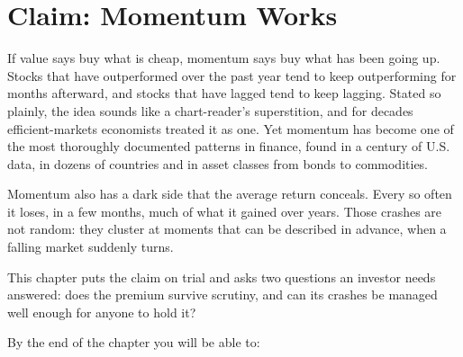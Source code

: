 \makeatletter
{}
\makeatother

\chapter{Claim: Momentum Works}
\label{ch:09}

If value says buy what is cheap, momentum says buy what has been going up. Stocks that have outperformed over the past year tend to keep outperforming for months afterward, and stocks that have lagged tend to keep lagging. Stated so plainly, the idea sounds like a chart-reader's superstition, and for decades efficient-markets economists treated it as one. Yet momentum has become one of the most thoroughly documented patterns in finance, found in a century of U.S. data, in dozens of countries and in asset classes from bonds to commodities.

Momentum also has a dark side that the average return conceals. Every so often it loses, in a few months, much of what it gained over years. Those crashes are not random: they cluster at moments that can be described in advance, when a falling market suddenly turns.

This chapter puts the claim on trial and asks two questions an investor needs answered: does the premium survive scrutiny, and can its crashes be managed well enough for anyone to hold it?

By the end of the chapter you will be able to:

